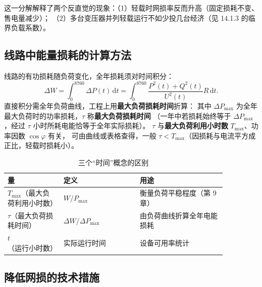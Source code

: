 这一分解解释了两个反直觉的现象：（1）轻载时网损率反而升高（固定损耗不变、售电量减少）；
（2）多台变压器并列轻载运行不如少投几台经济（见 14.1.3 的临界负载系数）。

\subsection{线路中能量损耗的计算方法}

线路的有功损耗随负荷变化，全年损耗须对时间积分：
\begin{equation}
  \Delta W=\int_{0}^{8760}\Delta P(t)\,\mathrm{d}t
  =\int_{0}^{8760}\frac{P^{2}(t)+Q^{2}(t)}{U^{2}(t)}R\,\mathrm{d}t .
\end{equation}
直接积分需全年负荷曲线，工程上用\textbf{最大负荷损耗时间}折算：
其中 $\Delta P_{\max}$ 为全年最大负荷时的功率损耗，$\tau$ 称\textbf{最大负荷损耗时间}
（一年中若损耗始终等于 $\Delta P_{\max}$，经过 $\tau$ 小时所耗电能恰等于全年实际损耗）。
$\tau$ 与\textbf{最大负荷利用小时数} $T_{\max}$、功率因数 $\cos\varphi$ 有关，
可由曲线或表格查得，一般 $\tau<T_{\max}$（因损耗与电流平方成正比，轻载时损耗小）。

\begin{table}[htbp]
  \centering
  \caption{三个“时间”概念的区别}
  \small
  \begin{tabular}{@{}p{0.22\linewidth}p{0.30\linewidth}p{0.34\linewidth}@{}}
    \toprule
    量 & 定义 & 用途 \\
    \midrule
    $T_{\max}$（最大负荷利用小时数） & $W/P_{\max}$ & 衡量负荷平稳程度（第 9 章） \\
    $\tau$（最大负荷损耗时间） & $\Delta W/\Delta P_{\max}$ & 由负荷曲线折算全年电能损耗 \\
    $t$（运行小时数） & 实际运行时间 & 设备可用率统计 \\
    \bottomrule
  \end{tabular}
\end{table}

\subsection{降低网损的技术措施}


